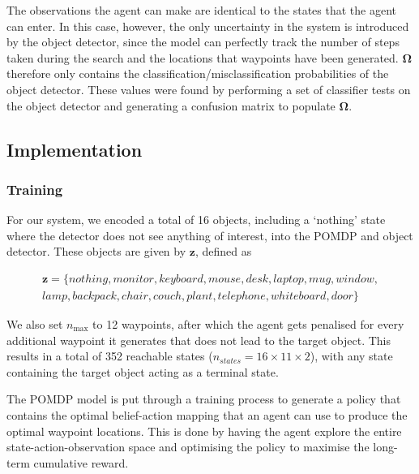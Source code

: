 \documentclass[runningheads]{llncs}
\begin{document}
The observations the agent can make are identical to the states that the agent can enter. 
In this case, however, the only uncertainty in the system is introduced by the object detector, since the model can perfectly track the number of steps taken during the search and the locations that waypoints have been generated.
$\mathbf{\Omega}$ therefore only contains the classification/misclassification probabilities of the object detector. 
These values were found by performing a set of classifier tests on the object detector and generating a confusion matrix to populate $\mathbf{\Omega}$.

\subsection{Implementation}

\subsubsection{Training}

For our system, we encoded a total of 16 objects, including a `nothing' state where the detector does not see anything of interest, into the POMDP and object detector. These objects are given by $\mathbf{z}$, defined as 

\begin{equation}
  \begin{split}
    \mathbf{z} = \{ nothing, monitor, keyboard, mouse, desk, laptop, mug, window,\\ 
      lamp, backpack, chair, couch, plant, telephone, whiteboard, door \}
  \end{split}
\end{equation}

We also set $n_{\max}$ to 12 waypoints, after which the agent gets penalised for every additional waypoint it generates that does not lead to the target object. 
This results in a total of 352 reachable states ($n_{states} = 16\times11\times2$), with any state containing the target object acting as a terminal state.

The POMDP model is put through a training process to generate a policy that contains the optimal belief-action mapping that an agent can use to produce the optimal waypoint locations.
This is done by having the agent explore the entire state-action-observation space and optimising the policy to maximise the long-term cumulative reward.
\end{document}
